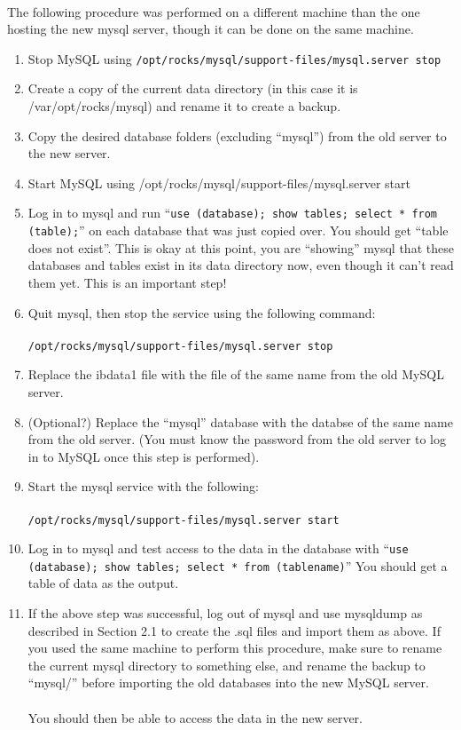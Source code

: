 \documentclass[12pt]{article}
\begin{document}
\paragraph{} The following procedure was performed on a different machine than the one hosting the new mysql server, though it can be done on the same machine.
\begin{enumerate}
\item Stop MySQL using {\tt /opt/rocks/mysql/support-files/mysql.server stop}
\item Create a copy of the current data directory (in this case it is /var/opt/rocks/mysql) and rename it to create a backup.
\item Copy the desired database folders (excluding ``mysql'') from the old server to the new server.
\item Start MySQL using /opt/rocks/mysql/support-files/mysql.server start
\item Log in to mysql and run ``{\tt use (database); show tables; select * from (table);}'' on each database that was just copied over. You should get ``table does not exist''. This is okay at this point, you are ``showing'' mysql that these databases and tables exist in its data directory now, even though it can't read them yet. This is an important step!
\item Quit mysql, then stop the service using the following command:
  \paragraph{} {\tt /opt/rocks/mysql/support-files/mysql.server stop}
\item Replace the ibdata1 file with the file of the same name from the old MySQL server.
\item (Optional?) Replace the ``mysql'' database with the databse of the same name from the old server. (You must know the password from the old server to log in to MySQL once this step is performed).
\item Start the mysql service with the following:
  \paragraph{} {\tt /opt/rocks/mysql/support-files/mysql.server start}
\item Log in to mysql and test access to the data in the database with ``{\tt use (database); show tables; select * from (tablename)}'' You should get a table of data as the output.
\item If the above step was successful, log out of mysql and use mysqldump as described in Section 2.1 to create the .sql files and import them as above. If you used the same machine to perform this procedure, make sure to rename the current mysql directory to something else, and rename the backup to ``mysql/'' before importing the old databases into the new MySQL server.
\paragraph{} You should then be able to access the data in the new server.
\end{enumerate}
\end{document}
